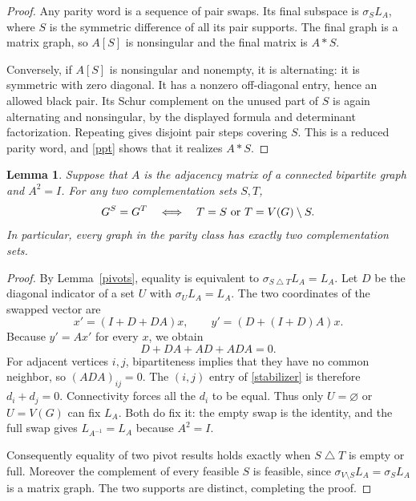 \documentclass[11pt]{article}
\newtheorem{lemma}{Lemma}
\begin{document}
\begin{proof}
Any parity word is a sequence of pair swaps. Its final subspace is
\(\sigma_SL_A\), where \(S\) is the symmetric difference of all its
pair supports. The final graph is a matrix graph, so \(A[S]\) is
nonsingular and the final matrix is \(A*S\).

Conversely, if \(A[S]\) is nonsingular and nonempty, it is alternating:
it is symmetric with zero diagonal. It has a nonzero off-diagonal
entry, hence an allowed black pair. Its Schur complement on the
unused part of \(S\) is again alternating and nonsingular, by
the displayed formula and determinant factorization. Repeating gives
disjoint pair steps covering \(S\). This is a reduced parity word,
and \eqref{ppt} shows that it realizes \(A*S\).
\end{proof}

\begin{lemma}\label{fibers}
Suppose that \(A\) is the adjacency matrix of a connected bipartite
graph and \(A^2=I\). For any two complementation sets \(S,T\),
\[
 G^S=G^T\quad\Longleftrightarrow\quad
 T=S\ \hbox{or}\ T=V(G)\setminus S.
\]
In particular, every graph in the parity class has exactly two
complementation sets.
\end{lemma}
\begin{proof}
By Lemma~\ref{pivots}, equality is equivalent to
\(\sigma_{S\mathbin{\triangle}T}L_A=L_A\).
Let \(D\) be the diagonal indicator of a set \(U\) with
\(\sigma_UL_A=L_A\). The two coordinates of the swapped vector are
\[
 x'=(I+D+DA)x,\qquad y'=(D+(I+D)A)x.
\]
Because \(y'=Ax'\) for every \(x\), we obtain
\begin{equation}\label{stabilizer}
 D+DA+AD+ADA=0.
\end{equation}
For adjacent vertices \(i,j\), bipartiteness implies that they have
no common neighbor, so \((ADA)_{ij}=0\). The \((i,j)\) entry of
\eqref{stabilizer} is therefore \(d_i+d_j=0\).
Connectivity forces all the \(d_i\) to be equal.
Thus only \(U=\varnothing\) or \(U=V(G)\) can fix \(L_A\).
Both do fix it: the empty swap is the identity, and the full swap
gives \(L_{A^{-1}}=L_A\) because \(A^2=I\).

Consequently equality of two pivot results holds exactly when
\(S\mathbin{\triangle}T\) is empty or full.
Moreover the complement of every feasible \(S\) is feasible, since
\(\sigma_{V\setminus S}L_A=\sigma_SL_A\) is a matrix graph.
The two supports are distinct, completing the proof.
\end{proof}
\end{document}
